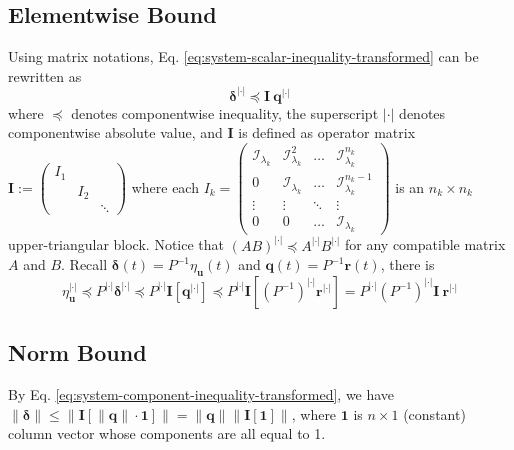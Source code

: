 \documentclass[accepted]{uai2023}
\newcommand{\vect}[1]{\mathbf{#1}}
\newcommand{\Err}{\eta}
\newcommand{\I}{\mathcal{I}}
\newcommand{\abs}{|\cdot|}
\begin{document}
\subsection{Elementwise Bound}
    Using matrix notations, Eq. \ref{eq:system-scalar-inequality-transformed} can be rewritten as
    \begin{equation} \label{eq:system-component-inequality-transformed}
        \pmb{\delta}^{\abs} \preceq \vect{I}\ \vect{q}^{\abs}
    \end{equation}
    where $\preceq$ denotes componentwise inequality, the superscript $\abs$ denotes componentwise absolute value, and $\vect{I}$ is defined as operator matrix $\vect{I} := \begin{pmatrix} I_1 \\ & I_2 \\ && \ddots \end{pmatrix}$ where each $I_k = \begin{pmatrix}
        \I_{\lambda_k} & \I_{\lambda_k}^2 & \dots &\I_{\lambda_k}^{n_k} \\
        0 & \I_{\lambda_k} & \dots &\I_{\lambda_k}^{n_k-1} \\
        \vdots & \vdots & \ddots & \vdots \\
        0 & 0 & \dots & \I_{\lambda_k}
    \end{pmatrix}$ is an $n_k \times n_k$ upper-triangular block.
    Notice that $(AB)^{\abs} \preceq A^{\abs} B^{\abs}$ for any compatible matrix $A$ and $B$. Recall $\pmb{\delta}(t) = P^{-1}\Err_{\vect{u}}(t)$ and $\pmb{q}(t) = P^{-1} \vect{r}(t)$, there is
    \begin{equation}
        \Err_{\vect{u}}^{\abs} 
        \preceq P^{\abs}\pmb{\delta}^{\abs} 
        \preceq P^{\abs} \vect{I} \left[\vect{q}^{\abs} \right]
        \preceq P^{\abs} \vect{I} \left[(P^{-1})^{\abs} \vect{r}^{\abs}\right]
        = P^{\abs} (P^{-1})^{\abs}  \vect{I}\ \vect{r}^{\abs}
    \end{equation}
\subsection{Norm Bound}
    By Eq. \ref{eq:system-component-inequality-transformed}, we have $ \|\pmb{\delta}\| \leq \big\|\vect{I} [\|\vect{q}\| \cdot \vect{1}]\big\| = \|\vect{q}\| \left\|\vect{I}[\vect{1}]\right\|$, where $\vect{1}$ is $n \times 1$ (constant) column vector whose components are all equal to 1.
\end{document}
